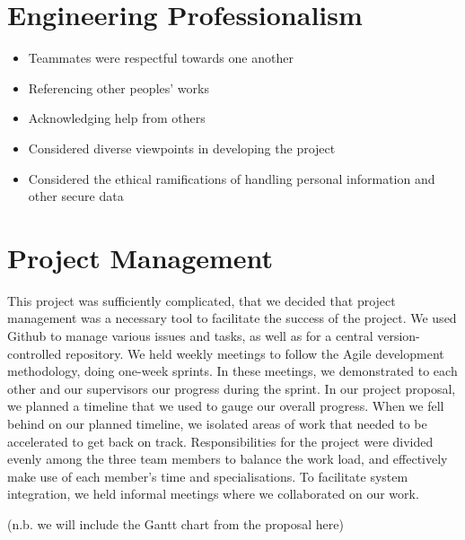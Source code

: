 \documentclass[12pt]{report}
\let\Oldsection\section
\renewcommand{\section}{\FloatBarrier\Oldsection}
\begin{document}

\section{Engineering Professionalism} \label{engineering-professionalism}

\begin{itemize}
    \item Teammates were respectful towards one another
    \item Referencing other peoples' works
    \item Acknowledging help from others
    \item Considered diverse viewpoints in developing the project
    \item Considered the ethical ramifications of handling personal information and other secure data
\end{itemize}


\section{Project Management} \label{project-management}

This project was sufficiently complicated, that we decided that project management was a necessary tool to facilitate 
the success of the project. We used Github to manage various issues and tasks, as well as for a central 
version-controlled repository. We held weekly meetings to follow the Agile development methodology, doing one-week 
sprints. In these meetings, we demonstrated to each other and our supervisors our progress during the sprint. In our 
project proposal, we planned a timeline that we used to gauge our overall progress. When we fell behind on our planned 
timeline, we isolated areas of work that needed to be accelerated to get back on track. Responsibilities for the 
project were divided evenly among the three team members to balance the work load, and effectively make use of each 
member's time and specialisations. To facilitate system integration, we held informal meetings where we collaborated on 
our work.

(n.b. we will include the Gantt chart from the proposal here)

\end{document}
